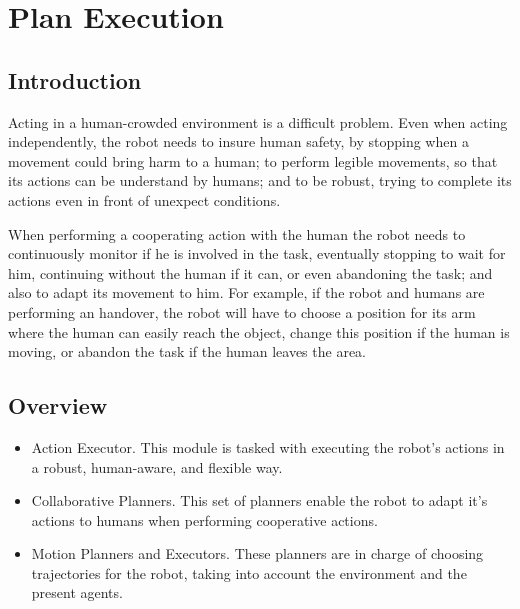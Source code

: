 
\chapter{Plan Execution} %

\label{chapter-plan_execution} %



\section{Introduction}

Acting in a human-crowded environment is a difficult problem. Even when acting independently, the robot needs to insure human safety, by stopping when a movement could bring harm to a human; to perform legible movements, so that its actions can be understand by humans; and to be robust, trying to complete its actions even in front of unexpect conditions.

When performing a cooperating action with the human the robot needs to continuously monitor if he is involved in the task, eventually stopping to wait for him, continuing without the human if it can, or even abandoning the task;  and also to adapt its movement to him. For example, if the robot and humans are performing an handover, the robot will have to choose a position for its arm where the human can easily reach the object, change this position if the human is moving, or abandon the task if the human leaves the area.

\section{Overview}

\begin{itemize}
	\item Action Executor. This module is tasked with executing the robot's actions in a robust, human-aware, and flexible way.
	\item Collaborative Planners. This set of planners enable the robot to adapt it's actions to humans when performing cooperative actions.
	\item Motion Planners and Executors. These planners are in charge of choosing trajectories for the robot,
taking into account the environment and the present agents.
\end{itemize}


